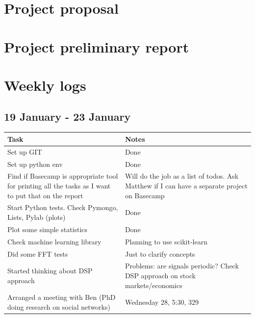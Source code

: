 \documentclass[11pt, oneside]{article}   	%
\begin{document}
\section{Project proposal}


\section{Project preliminary report}


\section{Weekly logs}
\subsection{19 January - 23 January}
\begin{tabularx}{\linewidth}{|X|X|}
  \hline
  Task & Notes \\
  \hline
  Set up GIT & Done \\
  \hline
  Set up python env & Done \\
  \hline
  Find if Basecamp is appropriate tool for printing all the tasks as I want to put that on the report & Will do the job as a list of todos. Ask Matthew if I can have a separate project on Basecamp \\
  \hline
  Start Python tests. Check Pymongo, Lists, Pylab (plots) & Done \\
  \hline
  Plot some simple statistics & Done \\
  \hline
  Check machine learning library & Planning to use scikit-learn\\
  \hline
  Did some FFT tests & Just to clarify concepts \\
  \hline
  Started thinking about DSP approach & Problems: are signals periodic? Check DSP approach on stock markets/economics \\
  \hline
  Arranged a meeting with Ben (PhD doing research on social networks) & Wednesday 28, 5:30, 329 \\
  \hline
\end{tabularx}
\end{document}
